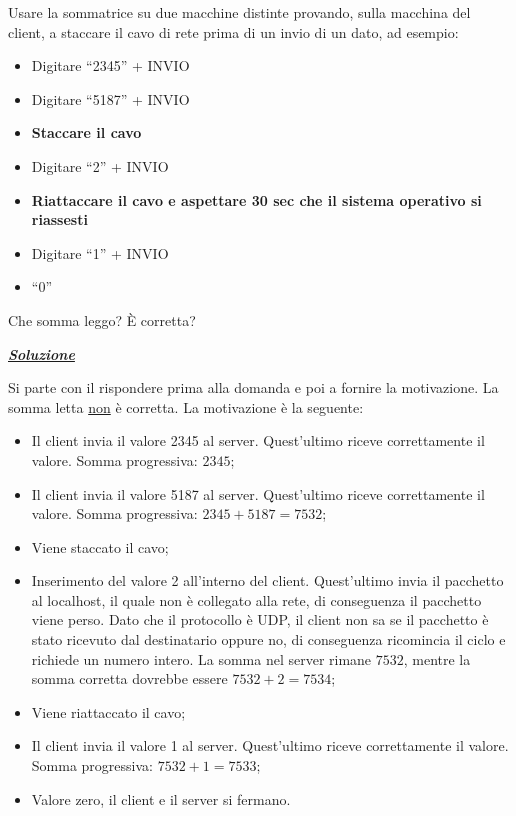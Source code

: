 \documentclass[a4paper]{article}
\newcommand{\dquotes}[1]{``#1''}
\begin{document}
	Usare la sommatrice su due macchine distinte provando, sulla macchina del client, a staccare il cavo di rete prima di un invio di un dato, ad esempio:
	\begin{itemize}
		\item Digitare \dquotes{2345} + INVIO
		\item Digitare \dquotes{5187} + INVIO
		\item \textbf{Staccare il cavo}
		\item Digitare \dquotes{2} + INVIO
		\item \textbf{Riattaccare il cavo e aspettare 30 sec che il sistema operativo si riassesti}
		\item Digitare \dquotes{1} + INVIO
		\item \dquotes{0}
	\end{itemize}
	Che somma leggo? È corretta?\newline
	
	\noindent
	\textcolor{Green4}{\textbf{\emph{\underline{Soluzione}}}}\newline
	
	\noindent
	Si parte con il rispondere prima alla domanda e poi a fornire la motivazione. La somma letta \underline{non} è corretta. La motivazione è la seguente:
	\begin{itemize}
		\item Il client invia il valore 2345 al server. Quest'ultimo riceve correttamente il valore. Somma progressiva: $2345$;
		
		\item Il client invia il valore 5187 al server. Quest'ultimo riceve correttamente il valore. Somma progressiva: $2345 + 5187 = 7532$;
		
		\item Viene staccato il cavo;
		
		\item Inserimento del valore 2 all'interno del client. Quest'ultimo invia il pacchetto al localhost, il quale non è collegato alla rete, di conseguenza il pacchetto viene perso. Dato che il protocollo è UDP, il client non sa se il pacchetto è stato ricevuto dal destinatario oppure no, di conseguenza ricomincia il ciclo e richiede un numero intero. La somma nel server rimane $7532$, mentre la somma corretta dovrebbe essere $7532+2=7534$;
		
		\item Viene riattaccato il cavo;
		
		\item Il client invia il valore 1 al server. Quest'ultimo riceve correttamente il valore. Somma progressiva: $7532+1 = 7533$;
		
		\item Valore zero, il client e il server si fermano.
	\end{itemize}\newpage
\end{document}
